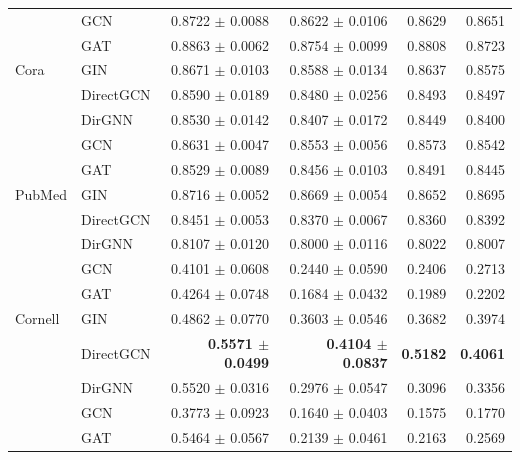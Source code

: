 \documentclass[utf8]{article}
\begin{document}
\begin{longtable}{llrrrr}
		& GCN       & 0.8722 $\pm$ 0.0088          & 0.8622 $\pm$ 0.0106          & 0.8629          & 0.8651          \\
		& GAT       & 0.8863 $\pm$ 0.0062          & 0.8754 $\pm$ 0.0099          & 0.8808          & 0.8723          \\
		Cora      & GIN       & 0.8671 $\pm$ 0.0103          & 0.8588 $\pm$ 0.0134          & 0.8637          & 0.8575          \\
		& DirectGCN & 0.8590 $\pm$ 0.0189          & 0.8480 $\pm$ 0.0256          & 0.8493          & 0.8497          \\
		& DirGNN    & 0.8530 $\pm$ 0.0142          & 0.8407 $\pm$ 0.0172          & 0.8449          & 0.8400          \\
		\midrule
		& GCN       & 0.8631 $\pm$ 0.0047          & 0.8553 $\pm$ 0.0056          & 0.8573          & 0.8542          \\
		& GAT       & 0.8529 $\pm$ 0.0089          & 0.8456 $\pm$ 0.0103          & 0.8491          & 0.8445          \\
		PubMed    & GIN       & 0.8716 $\pm$ 0.0052          & 0.8669 $\pm$ 0.0054          & 0.8652          & 0.8695          \\
		& DirectGCN & 0.8451 $\pm$ 0.0053          & 0.8370 $\pm$ 0.0067          & 0.8360          & 0.8392          \\
		& DirGNN    & 0.8107 $\pm$ 0.0120          & 0.8000 $\pm$ 0.0116          & 0.8022          & 0.8007          \\
		\midrule
		& GCN       & 0.4101 $\pm$ 0.0608          & 0.2440 $\pm$ 0.0590          & 0.2406          & 0.2713          \\
		& GAT       & 0.4264 $\pm$ 0.0748          & 0.1684 $\pm$ 0.0432          & 0.1989          & 0.2202          \\
		Cornell   & GIN       & 0.4862 $\pm$ 0.0770          & 0.3603 $\pm$ 0.0546          & 0.3682          & 0.3974          \\
		& DirectGCN & \textbf{0.5571 $\pm$ 0.0499} & \textbf{0.4104 $\pm$ 0.0837} & \textbf{0.5182} & \textbf{0.4061} \\
		& DirGNN    & 0.5520 $\pm$ 0.0316          & 0.2976 $\pm$ 0.0547          & 0.3096          & 0.3356          \\
		\midrule
		& GCN       & 0.3773 $\pm$ 0.0923          & 0.1640 $\pm$ 0.0403          & 0.1575          & 0.1770          \\
		& GAT       & 0.5464 $\pm$ 0.0567          & 0.2139 $\pm$ 0.0461          & 0.2163          & 0.2569          \\

\end{longtable}
\end{document}
